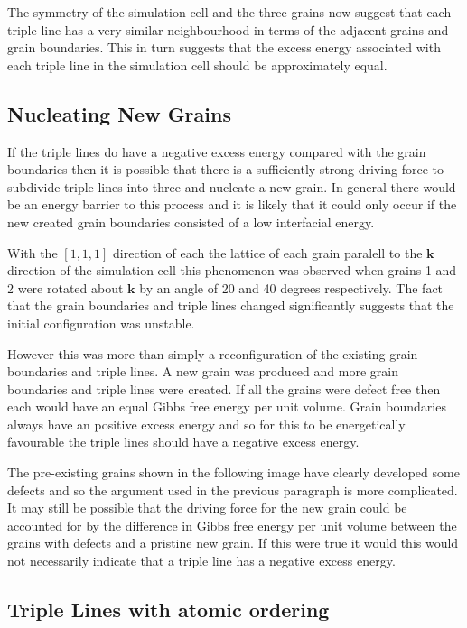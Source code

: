 \documentclass[12pt,a4paper]{book}
\begin{document}
The symmetry of the simulation cell and the three grains now suggest that each triple line has a very similar neighbourhood in terms of the adjacent grains and grain boundaries. This in turn suggests that the excess energy associated with each triple line in the simulation cell should be approximately equal.

\subsection{Nucleating New Grains}

If the triple lines do have a negative excess energy compared with the grain boundaries then it is possible that there is a sufficiently strong driving force to subdivide triple lines into three and nucleate a new grain. In general there would be an energy barrier to this process and it is likely that it could only occur if the new created grain boundaries consisted of a low interfacial energy.

With the $[1,1,1]$ direction of each the lattice of each grain paralell to the $\mathbf{k}$ direction of the simulation cell this phenomenon was observed when grains 1 and 2 were rotated about $\mathbf{k}$  by an angle of 20 and 40 degrees respectively. The fact that the grain boundaries and triple lines changed significantly suggests that the initial configuration was unstable. 

However this was more than simply a reconfiguration of the existing grain boundaries and triple lines. A new grain was produced and more grain boundaries and triple lines were created. If all the grains were defect free then each would have an equal Gibbs free energy per unit volume. Grain boundaries always have an positive excess energy and so for this to be energetically favourable the triple lines should have a negative excess energy.

The pre-existing grains shown in the following image have clearly developed some defects and so the argument used in the previous paragraph is more complicated. It may still be possible that the driving force for the new grain could be accounted for by the difference in Gibbs free energy per unit volume between the grains with defects and a pristine new grain. If this were true it would this would not necessarily indicate that a triple line has a negative excess energy.


\subsection{Triple Lines with atomic ordering}
\end{document}

